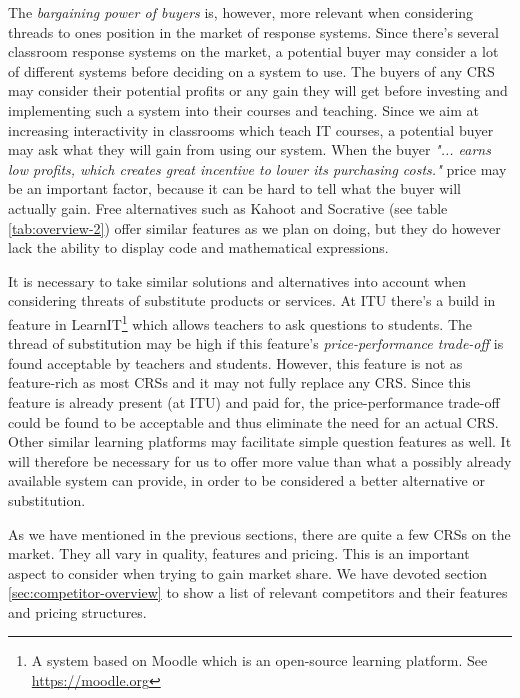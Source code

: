The \emph{bargaining power of buyers} is, however, more relevant when considering threads to ones position in the market of response systems. Since there's several classroom response systems on the market, a potential buyer may consider a lot of different systems before deciding on a system to use. The buyers of any CRS may consider their potential profits or any gain they will get before investing and implementing such a system into their courses and teaching. Since we aim at increasing interactivity in classrooms which teach IT courses, a potential buyer may ask what they will gain from using our system. When the buyer \emph{"... earns low profits, which creates great incentive to lower its purchasing costs."} \cite[p.~141]{porter1979competitive} price may be an important factor, because it can be hard to tell what the buyer will actually gain.
Free alternatives such as Kahoot and Socrative (see table \ref{tab:overview-2}) offer similar features as we plan on doing, but they do however lack the ability to display code and mathematical expressions.


It is necessary to take similar solutions and alternatives into account when considering threats of substitute products or services. At ITU there's a build in feature in LearnIT\footnote{A system based on Moodle which is an open-source learning platform. See \url{https://moodle.org}} which allows teachers to ask questions to students. The thread of substitution may be high if this feature's \emph{price-performance trade-off} is found acceptable by teachers and students. However, this feature is not as feature-rich as most CRSs and it may not fully replace any CRS. Since this feature is already present (at ITU) and paid for, the price-performance trade-off could be found to be acceptable and thus eliminate the need for an actual CRS. Other similar learning platforms may facilitate simple question features as well. It will therefore be necessary for us to offer more value than what a possibly already available system can provide, in order to be considered a better alternative or substitution. 


As we have mentioned in the previous sections, there are quite a few CRSs on the market. They all vary in quality, features and pricing. This is an important aspect to consider when trying to gain market share. We have devoted section \ref{sec:competitor-overview} to show a list of relevant competitors and their features and pricing structures.








